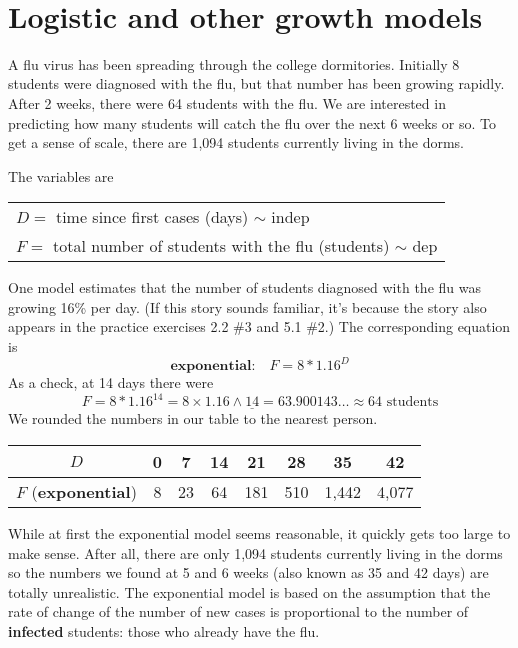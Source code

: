 ~\vspace{.1in}

\section{Logistic and other growth models}

A flu virus has been spreading through the college dormitories. Initially 8 students were diagnosed with the flu, but that number has been growing rapidly.  After 2 weeks, there were 64 students with the flu.   We are interested in predicting how many students will catch the flu over the next 6 weeks or so.  To get a sense of scale, there are 1,094 students currently living in the dorms. 

The variables are
\begin{center}
\begin{tabular} {l} 
$D=$ time since first cases (days) $\sim$ indep \\
$F= $ total number of students with the flu (students) $\sim$ dep \\ 
\end{tabular}
\end{center}

One model estimates that the number of students diagnosed with the flu was growing 16\% per day.  (If this story sounds familiar, it's because the story also appears in the practice exercises 2.2 \#3 and 5.1 \#2.)  The corresponding equation is
$$\textbf{exponential:} \quad F = 8 \ast 1.16^D$$
As a check, at 14 days there were
$$F = 8 \ast 1.16^{14} = 8 \times 1.16 \wedge \underline{14} = 63.900143\ldots \approx 64 \text{ students}$$
We rounded the numbers in our table to the nearest person. 

\begin{center}
\begin{tabular} {|c| |c|c|c |c|c |c|c|}\hline
$D$ & 0 & 7 & 14 & 21 & 28 & 35 & 42 \\ \hline
$F$ (\textbf{exponential}) & 8 & 23 & 64 & 181 & 510 & 1,442 & 4,077 \\ \hline
\end{tabular}
\end{center}

While at first the exponential model seems reasonable, it quickly gets too large to make sense.  After all, there are only  1,094 students currently living in the dorms so the numbers we found at 5 and 6 weeks (also known as 35 and 42 days) are totally unrealistic.   The exponential model is based on the assumption that the rate of change of the number of new cases is proportional to the number of \textbf{infected} students: those who already have the flu.  

